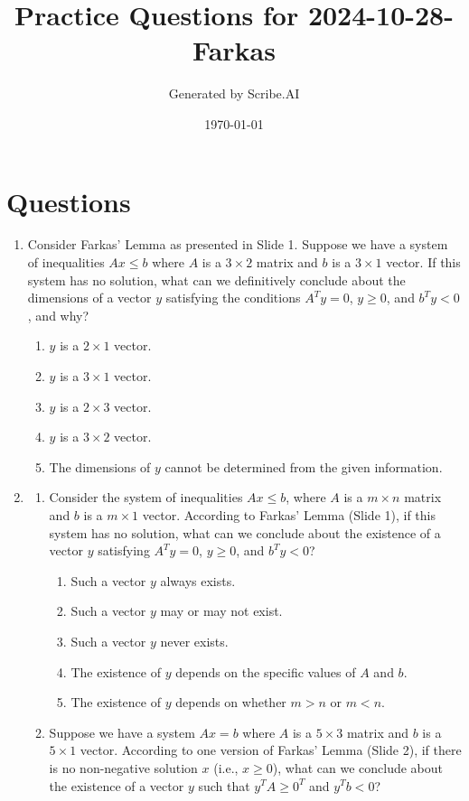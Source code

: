 \documentclass{article}%
\title{Practice Questions for 2024{-}10{-}28{-}Farkas}%
\author{Generated by Scribe.AI}%
\date{\today}%
\begin{document}
%
\normalsize%
\maketitle%
\section{Questions}%
\label{sec:Questions}%
\begin{enumerate}%
\item Consider Farkas' Lemma as presented in Slide 1.  Suppose we have a system of inequalities $Ax \le b$ where $A$ is a $3 \times 2$ matrix and $b$ is a $3 \times 1$ vector.  If this system has no solution, what can we definitively conclude about the dimensions of a vector $y$ satisfying the conditions $A^T y = 0$, $y \ge 0$, and $b^T y < 0$, and why?%
\begin{enumerate}%
\item $y$ is a $2 \times 1$ vector.%
\item $y$ is a $3 \times 1$ vector.%
\item $y$ is a $2 \times 3$ vector.%
\item $y$ is a $3 \times 2$ vector.%
\item The dimensions of $y$ cannot be determined from the given information.%
\end{enumerate}%
\vspace{1em}%
\item%
\begin{enumerate}%
\item Consider the system of inequalities $Ax \le b$, where $A$ is a $m \times n$ matrix and $b$ is a $m \times 1$ vector.  According to Farkas' Lemma (Slide 1), if this system has no solution, what can we conclude about the existence of a vector $y$ satisfying $A^T y = 0$, $y \ge 0$, and $b^T y < 0$?%
\begin{enumerate}%
\item Such a vector $y$ always exists.%
\item Such a vector $y$ may or may not exist.%
\item Such a vector $y$ never exists.%
\item The existence of $y$ depends on the specific values of $A$ and $b$.%
\item The existence of $y$ depends on whether $m > n$ or $m < n$.%
\end{enumerate}%
\vspace{0.5em}%
\item Suppose we have a system $Ax = b$ where $A$ is a $5 \times 3$ matrix and $b$ is a $5 \times 1$ vector.  According to one version of Farkas' Lemma (Slide 2), if there is no non-negative solution $x$ (i.e., $x \ge 0$), what can we conclude about the existence of a vector $y$ such that $y^T A \ge 0^T$ and $y^T b < 0$?%

\end{enumerate}
\end{enumerate}
\end{document}
